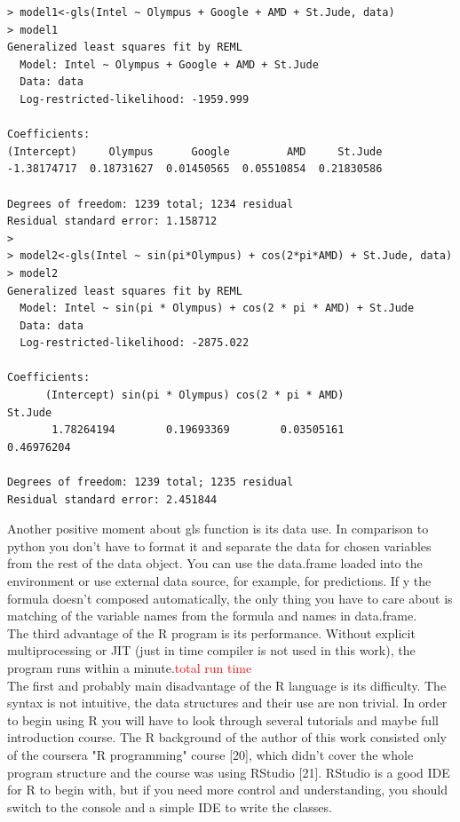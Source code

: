 \documentclass{article}
\begin{document}
\begin{verbatim}
> model1<-gls(Intel ~ Olympus + Google + AMD + St.Jude, data)
> model1
Generalized least squares fit by REML
  Model: Intel ~ Olympus + Google + AMD + St.Jude 
  Data: data 
  Log-restricted-likelihood: -1959.999

Coefficients:
(Intercept)     Olympus      Google         AMD     St.Jude 
-1.38174717  0.18731627  0.01450565  0.05510854  0.21830586 

Degrees of freedom: 1239 total; 1234 residual
Residual standard error: 1.158712
>
> model2<-gls(Intel ~ sin(pi*Olympus) + cos(2*pi*AMD) + St.Jude, data)
> model2
Generalized least squares fit by REML
  Model: Intel ~ sin(pi * Olympus) + cos(2 * pi * AMD) + St.Jude 
  Data: data 
  Log-restricted-likelihood: -2875.022

Coefficients:
      (Intercept) sin(pi * Olympus) cos(2 * pi * AMD)           St.Jude 
       1.78264194        0.19693369        0.03505161        0.46976204 

Degrees of freedom: 1239 total; 1235 residual
Residual standard error: 2.451844
\end{verbatim}
Another positive moment about gls function is its data use. In comparison to python you don't have to format it and separate the data for chosen variables from the rest of the data object. You can use the data.frame loaded into the environment or use external data source, for example, for predictions. If y the formula doesn't composed automatically, the only thing you have to care about is matching of the variable names from the formula and names in data.frame.\\
The third advantage of the R program is its performance. Without explicit multiprocessing or JIT (just in time compiler is not used in this work), the program runs within a minute.\textcolor{red}{total run time}\\
The first and probably main disadvantage of the R language is its difficulty. The syntax is not intuitive, the data structures and their use are non trivial. In order to begin using R you will have to look through several tutorials and maybe full introduction course. The R background of the author of this work consisted only of the coursera "R programming" course [20], which didn't cover the whole program structure and the course was using RStudio [21]. RStudio is a good IDE for R to begin with, but if you need more control and understanding, you should switch to the console and a simple IDE to write the classes.\\
\end{document}

